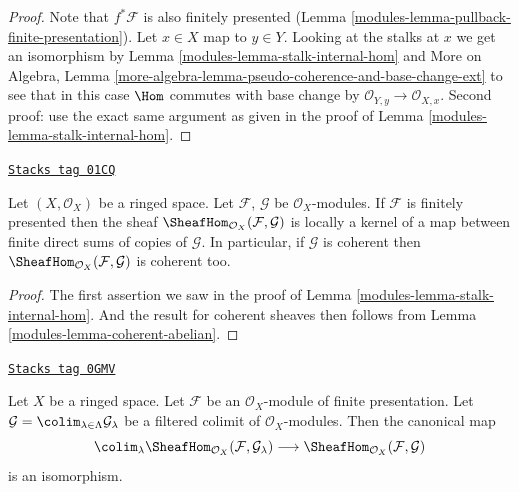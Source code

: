 \begin{proof}

Note that $f^*\mathcal{F}$ is also finitely presented
(Lemma \ref{modules-lemma-pullback-finite-presentation}).
Let $x \in X$ map to $y \in Y$. Looking at the stalks
at $x$ we get an isomorphism by
Lemma \ref{modules-lemma-stalk-internal-hom} and
More on Algebra, Lemma
\ref{more-algebra-lemma-pseudo-coherence-and-base-change-ext}
to see that in this case $\Hom$ commutes with base change by
$\mathcal{O}_{Y, y} \to \mathcal{O}_{X, x}$.
Second proof: use the exact same argument as given
in the proof of Lemma \ref{modules-lemma-stalk-internal-hom}.
\end{proof}

\begin{lemma}
\label{modules-lemma-internal-hom-locally-kernel-direct-sum}
\href{https://stacks.math.columbia.edu/tag/01CQ}{\texttt{Stacks tag 01CQ}}

Let $(X, \mathcal{O}_X)$ be a ringed space.
Let $\mathcal{F}$, $\mathcal{G}$ be $\mathcal{O}_X$-modules.
If $\mathcal{F}$ is finitely presented then the sheaf
$\SheafHom_{\mathcal{O}_X}(\mathcal{F}, \mathcal{G})$ is
locally a kernel of a map between finite direct sums
of copies of $\mathcal{G}$.
In particular, if $\mathcal{G}$ is coherent then
$\SheafHom_{\mathcal{O}_X}(\mathcal{F}, \mathcal{G})$
is coherent too.
\end{lemma}

\begin{proof}

The first assertion
we saw in the proof of Lemma \ref{modules-lemma-stalk-internal-hom}.
And the result for coherent sheaves then follows from
Lemma \ref{modules-lemma-coherent-abelian}.
\end{proof}

\begin{lemma}
\label{modules-lemma-hom-finite-presentation-colimit}
\href{https://stacks.math.columbia.edu/tag/0GMV}{\texttt{Stacks tag 0GMV}}

Let $X$ be a ringed space. Let $\mathcal{F}$ be an $\mathcal{O}_X$-module
of finite presentation. Let
$\mathcal{G} = \colim_{\lambda \in \Lambda} \mathcal{G}_\lambda$
be a filtered colimit of $\mathcal{O}_X$-modules. Then the canonical map
$$
\colim_\lambda \SheafHom_{\mathcal{O}_X}(\mathcal{F}, \mathcal{G}_\lambda)
\longrightarrow
\SheafHom_{\mathcal{O}_X}(\mathcal{F}, \mathcal{G})
$$
is an isomorphism.
\end{lemma}

